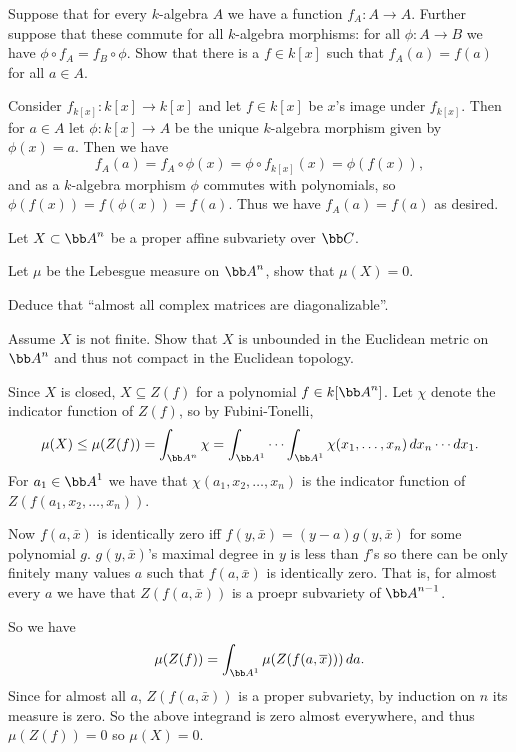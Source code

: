 \bprob

    Suppose that for every $k$-algebra $A$ we have a function $f_A\colon A\to A$.
    Further suppose that these commute for all $k$-algebra morphisms: for all $\phi\colon A\to B$ we have $\phi\circ f_A=f_B\circ\phi$.
    Show that there is a $f\in k[x]$ such that $f_A(a)=f(a)$ for all $a\in A$.

\eprob

Consider $f_{k[x]}\colon k[x]\to k[x]$ and let $f\in k[x]$ be $x$'s image under $f_{k[x]}$.
Then for $a\in A$ let $\phi\colon k[x]\to A$ be the unique $k$-algebra morphism given by $\phi(x)=a$.
Then we have
$$ f_A(a) = f_A\circ\phi(x) = \phi\circ f_{k[x]}(x) = \phi(f(x)) , $$
and as a $k$-algebra morphism $\phi$ commutes with polynomials, so $\phi(f(x))=f(\phi(x))=f(a)$.
Thus we have $f_A(a)=f(a)$ as desired.

\bprob

    Let $X\subset\bA^n$ be a proper affine subvariety over $\bC$.
    \benum
        \item Let $\mu$ be the Lebesgue measure on $\bA^n$, show that $\mu(X)=0$.
        \item Deduce that ``almost all complex matrices are diagonalizable''.
        \item Assume $X$ is not finite.
        Show that $X$ is unbounded in the Euclidean metric on $\bA^n$ and thus not compact in the Euclidean topology.
    \eenum

\eprob

\benum
    \item Since $X$ is closed, $X\subseteq Z(f)$ for a polynomial $f\in k[\bA^n]$.
    Let $\chi$ denote the indicator function of $Z(f)$, so by Fubini-Tonelli,
    $$ \mu(X) \leq \mu(Z(f)) = \int_{\bA^n}\chi = \int_{\bA^1}\cdots\int_{\bA^1}\chi(x_1,\dots,x_n)\,dx_n\cdots dx_1 . $$
    For $a_1\in\bA^1$ we have that $\chi(a_1,x_2,\dots,x_n)$ is the indicator function of $Z(f(a_1,x_2,\dots,x_n))$.

    Now $f(a,\bar x)$ is identically zero iff $f(y,\bar x)=(y-a)g(y,\bar x)$ for some polynomial $g$.
    $g(y,\bar x)$'s maximal degree in $y$ is less than $f$'s so there can be only finitely many values $a$ such that
    $f(a,\bar x)$ is identically zero.
    That is, for almost every $a$ we have that $Z(f(a,\bar x))$ is a proepr subvariety of $\bA^{n-1}$.

    So we have
    $$ \mu(Z(f)) = \int_{\bA^1}\mu(Z(f(a,\bar x)))\,da . $$
    Since for almost all $a$, $Z(f(a,\bar x))$ is a proper subvariety, by induction on $n$ its measure is zero.
    So the above integrand is zero almost everywhere, and thus $\mu(Z(f))=0$ so $\mu(X)=0$.

